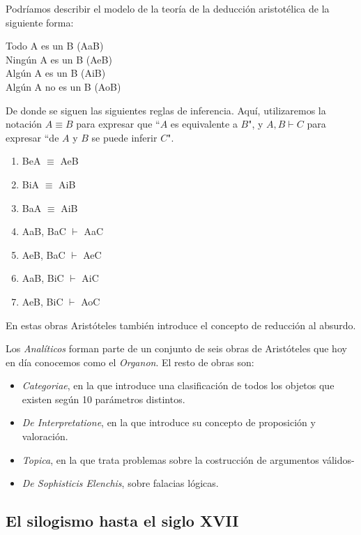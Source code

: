 \documentclass{article}
\begin{document}
Podríamos describir el modelo de la teoría de la deducción aristotélica de la siguiente forma:

\begin{displayquote}
Todo A es un B (AaB)\\
Ningún A es un B (AeB)\\
Algún A es un B (AiB)\\
Algún A no es un B (AoB)\\
\end{displayquote}

De donde se siguen las siguientes reglas de inferencia\cite{corcoran2009aristotle,smith1989prior}. Aquí, utilizaremos la notación $A \equiv B$ para expresar que ``$A$ es equivalente a $B$", y $A, B \vdash C$ para expresar ``de $A$ y $B$ se puede inferir $C$".

\begin{enumerate}
    \item BeA $\equiv$ AeB
    \item BiA $\equiv$ AiB
    \item BaA $\equiv$ AiB
    \item AaB, BaC $\vdash$ AaC
    \item AeB, BaC $\vdash$ AeC
    \item AaB, BiC $\vdash$ AiC
    \item AeB, BiC $\vdash$ AoC
\end{enumerate}

En estas obras Aristóteles también introduce el concepto de reducción al absurdo.

Los \textit{Analíticos} forman parte de un conjunto de seis obras de Aristóteles que hoy en día conocemos como el \textit{Organon}. El resto de obras son:

\begin{itemize}
    \item \textit{Categoriae}, en la que introduce una clasificación de todos los objetos que existen según 10 parámetros distintos.
    \item \textit{De Interpretatione}, en la que introduce su concepto de proposición y valoración.
    \item \textit{Topica}, en la que trata problemas sobre la costrucción de argumentos válidos-
    \item \textit{De Sophisticis Elenchis}, sobre falacias lógicas.
\end{itemize}

\subsection{El silogismo hasta el siglo XVII}
\end{document}
